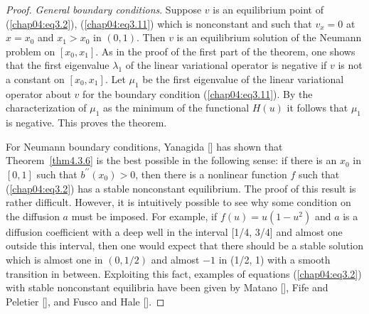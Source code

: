 \documentclass{surv-l}
\theoremstyle{plain}
\theoremstyle{definition}
\numberwithin{equation}{section}
\numberwithin{figure}{chapter}
\begin{document}
\begin{proof}
\emph{General boundary conditions}. Suppose $v$ is an equilibrium point of (\ref{chap04:eq3.2}), (\ref{chap04:eq3.11}) which is nonconstant and such that $v_{x}=0$ at $x=x_{0}$ and $x_{1}>x_{0}$ in $(0,1)$. Then $v$ is an equilibrium solution of the Neumann problem on $[x_{0}, x_{1}]$. As in the proof of the first part of the theorem, one shows that the first eigenvalue $\lambda_{1}$ of the linear variational operator is negative if $v$ is not a constant on $[x_{0}, x_{1}]$. Let $\mu_{1}$ be the first eigenvalue of the linear variational operator about $v$ for the boundary condition (\ref{chap04:eq3.11}). By the characterization of $\mu_{1}$ as the minimum of the functional $H(u)$ it follows that $\mu_{1}$ is negative. This proves the theorem.

For Neumann boundary conditions, Yanagida [\citeyear{1982y}] has shown that Theorem~\ref{thm4.3.6} is the best possible in the following sense: if there is an $x_{0}$ in $[0,1]$ such that $b^{\prime\prime}(x_{0})>0$, then there is a nonlinear function $f$ such that (\ref{chap04:eq3.2}) has a stable nonconstant equilibrium. The proof of this result is rather difficult. However, it is intuitively possible to see why some condition on the diffusion $a$ must be imposed. For example, if $f(u)=u(1-u^{2})$ and $a$ is a diffusion coefficient with a deep well in the interval [1/4, 3/4] and almost one outside this interval, then one would expect that there should be a stable solution which is almost one in $(0,1/2)$ and almost $-1$ in (1/2, 1) with a smooth transition in between. Exploiting this fact, examples of equations (\ref{chap04:eq3.2}) with stable nonconstant equilibria have been given by Matano [\citeyear{1979m}], Fife and Peletier [\citeyear{1981fp}], and Fusco and Hale [\citeyear{1985fh}].
\end{proof}
\end{document}

